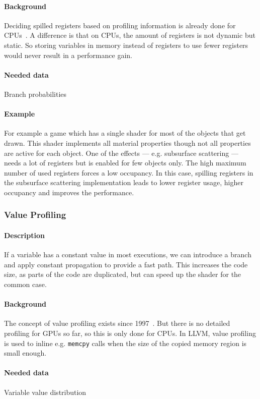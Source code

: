 \paragraph{Background} Deciding spilled registers based on profiling information is already done for CPUs~\cite{Bakhvalov2019}. A difference is that on CPUs, the amount of registers is not dynamic but static. So storing variables in memory instead of registers to use fewer registers would never result in a performance gain.
\paragraph{Needed data} Branch probabilities
\paragraph{Example} For example a game which has a single shader for most of the objects that get drawn. This shader implements all material properties though not all properties are active for each object.
One of the effects --- e.g. subsurface scattering --- needs a lot of registers but is enabled for few objects only. The high maximum number of used registers forces a low occupancy.
In this case, spilling registers in the subsurface scattering implementation leads to lower register usage, higher occupancy and improves the performance.

\subsubsection{Value Profiling}
\paragraph{Description} If a variable has a constant value in most executions, we can introduce a branch and apply constant propagation to provide a fast path. This increases the code size, as parts of the code are duplicated, but can speed up the shader for the common case.
\paragraph{Background} The concept of value profiling exists since 1997~\cite{Calder1997}. But there is no detailed profiling for GPUs so far, so this is only done for CPUs. In LLVM, value profiling is used to inline e.g. \texttt{memcpy} calls when the size of the copied memory region is small enough.
\paragraph{Needed data} Variable value distribution
